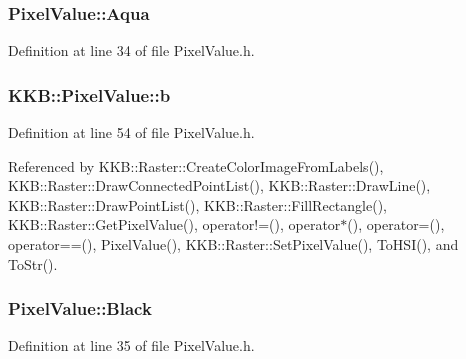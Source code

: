 \subsubsection[{\texorpdfstring{Aqua}{Aqua}}]{ Pixel\+Value\+::\+Aqua\hspace{0.3cm}{\ttfamily [static]}}\hypertarget{class_k_k_b_1_1_pixel_value_a51fc16a4bf4f2c1470b793db00e51db9}{}\label{class_k_k_b_1_1_pixel_value_a51fc16a4bf4f2c1470b793db00e51db9}


Definition at line 34 of file Pixel\+Value.\+h.

\subsubsection[{\texorpdfstring{b}{b}}]{ K\+K\+B\+::\+Pixel\+Value\+::b}\hypertarget{class_k_k_b_1_1_pixel_value_ac43e49760f71b756dba6c40e80e7917a}{}\label{class_k_k_b_1_1_pixel_value_ac43e49760f71b756dba6c40e80e7917a}


Definition at line 54 of file Pixel\+Value.\+h.



Referenced by K\+K\+B\+::\+Raster\+::\+Create\+Color\+Image\+From\+Labels(), K\+K\+B\+::\+Raster\+::\+Draw\+Connected\+Point\+List(), K\+K\+B\+::\+Raster\+::\+Draw\+Line(), K\+K\+B\+::\+Raster\+::\+Draw\+Point\+List(), K\+K\+B\+::\+Raster\+::\+Fill\+Rectangle(), K\+K\+B\+::\+Raster\+::\+Get\+Pixel\+Value(), operator!=(), operator$\ast$(), operator=(), operator==(), Pixel\+Value(), K\+K\+B\+::\+Raster\+::\+Set\+Pixel\+Value(), To\+H\+S\+I(), and To\+Str().

\subsubsection[{\texorpdfstring{Black}{Black}}]{ Pixel\+Value\+::\+Black\hspace{0.3cm}{\ttfamily [static]}}\hypertarget{class_k_k_b_1_1_pixel_value_af2eb1c2546e02ff0f6c14ab76e604e19}{}\label{class_k_k_b_1_1_pixel_value_af2eb1c2546e02ff0f6c14ab76e604e19}


Definition at line 35 of file Pixel\+Value.\+h.




